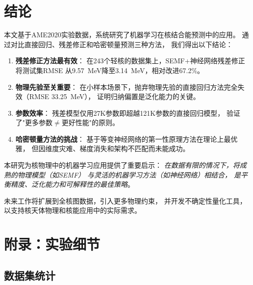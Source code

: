 \documentclass[12pt, a4paper]{article}
\begin{document}
\section{结论}
\label{sec:conclusion}

本文基于AME2020实验数据，系统研究了机器学习在核结合能预测中的应用。
通过对比直接回归、残差修正和哈密顿量预测三种方法，
我们得出以下结论：

\begin{enumerate}
  \item \textbf{残差修正方法最有效}：
        在243个轻核的数据集上，SEMF+神经网络残差修正将测试集RMSE
        从9.57~MeV降至3.14~MeV，相对改进67.2\%。

  \item \textbf{物理先验至关重要}：
        在小样本场景下，抛弃物理先验的直接回归方法完全失效（RMSE 33.25~MeV），
        证明归纳偏置是泛化能力的关键。

  \item \textbf{参数效率}：
        残差模型仅用27K参数即超越121K参数的直接回归模型，
        验证了"更多参数$\neq$更好性能"的原则。

  \item \textbf{哈密顿量方法的挑战}：
        基于等变神经网络的第一性原理方法在理论上最优雅，
        但因维度灾难、梯度消失和架构不匹配而未能成功。
\end{enumerate}

本研究为核物理中的机器学习应用提供了重要启示：
\emph{在数据有限的情况下，将成熟的物理模型（如SEMF）
与灵活的机器学习方法（如神经网络）相结合，
是平衡精度、泛化能力和可解释性的最佳策略}。

未来工作将扩展到全核图数据，引入更多物理约束，
并开发不确定性量化工具，以支持核天体物理和核能应用中的实际需求。




\appendix

\section{附录：实验细节}
\label{sec:appendix}

\subsection{数据集统计}
\end{document}
